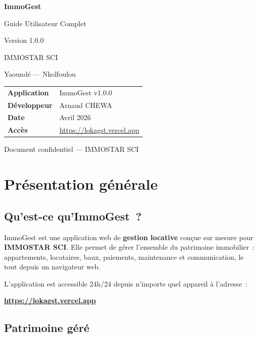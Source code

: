 \documentclass[12pt,a4paper]{article}
\begin{document}
\begin{titlepage}
\centering
\vspace*{2cm}
{\Huge\bfseries\textcolor{immoFonce}{ImmoGest}\par}
\vspace{0.3cm}
{\Large\textcolor{immoCiel}{Guide Utilisateur Complet}\par}
\vspace{0.5cm}
{\large Version 1.0.0\par}
\vspace{2cm}
{\LARGE\textcolor{immoBleu}{IMMOSTAR SCI}\par}
\vspace{0.3cm}
{\large Yaound\'e --- Nkolfoulou\par}
\vspace{3cm}
\begin{tabular}{ll}
\textbf{Application} & ImmoGest v1.0.0 \\
\textbf{D\'eveloppeur} & Arnaud CHEWA \\
\textbf{Date} & Avril 2026 \\
\textbf{Acc\`es} & \url{https://lokagst.vercel.app} \\
\end{tabular}
\vfill
{\small\textcolor{grisTexte}{Document confidentiel --- IMMOSTAR SCI}}
\end{titlepage}

\tableofcontents
\newpage

\section{Pr\'esentation g\'en\'erale}

\subsection{Qu'est-ce qu'ImmoGest~?}

ImmoGest est une application web de \textbf{gestion locative} con\c{c}ue sur mesure pour \textbf{IMMOSTAR SCI}. Elle permet de g\'erer l'ensemble du patrimoine immobilier~: appartements, locataires, baux, paiements, maintenance et communication, le tout depuis un navigateur web.

L'application est accessible 24h/24 depuis n'importe quel appareil \`a l'adresse~:
\begin{center}
\large\textbf{\url{https://lokagst.vercel.app}}
\end{center}

\subsection{Patrimoine g\'er\'e}
\end{document}

